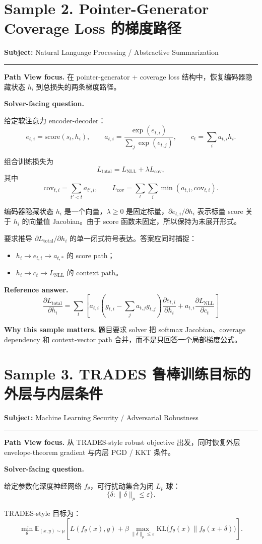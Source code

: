 \documentclass[11pt]{ctexart}
\newcommand{\sampletitle}[2]{
  \section*{\textcolor{agenblue}{#1}}
  \textbf{Subject:} #2
  \vspace{0.25em}
  \hrule
  \vspace{0.6em}
}
\newcommand{\focus}[1]{\textbf{Path View focus.} #1}
\newcommand{\why}[1]{\textbf{Why this sample matters.} #1}
\begin{document}
\sampletitle{Sample 2. Pointer-Generator Coverage Loss 的梯度路径}{Natural Language Processing / Abstractive Summarization}

\focus{在 pointer-generator + coverage loss 结构中，恢复编码器隐藏状态 $h_i$ 到总损失的两条梯度路径。}

\textbf{Solver-facing question.}

给定软注意力 encoder-decoder：
\[
e_{t,i}=\mathrm{score}(s_t,h_i),\qquad
a_{t,i}=\frac{\exp(e_{t,i})}{\sum_j\exp(e_{t,j})},\qquad
c_t=\sum_i a_{t,i}h_i.
\]

组合训练损失为
\[
L_{\mathrm{total}}=L_{\mathrm{NLL}}+\lambda L_{\mathrm{cov}},
\]
其中
\[
\mathrm{cov}_{t,i}=\sum_{t'<t}a_{t',i},\qquad
L_{\mathrm{cov}}=\sum_t\sum_i\min(a_{t,i},\mathrm{cov}_{t,i}).
\]

编码器隐藏状态 $h_i$ 是一个向量，$\lambda\geq0$ 是固定标量，$\partial e_{t,i}/\partial h_i$ 表示标量 score 关于 $h_i$ 的向量值 Jacobian。由于 score 函数未固定，所以保持为未展开形式。

要求推导 $\partial L_{\mathrm{total}}/\partial h_i$ 的单一闭式符号表达。答案应同时捕捉：
\begin{itemize}
  \item $h_i\rightarrow e_{t,i}\rightarrow a_{t,*}$ 的 score path；
  \item $h_i\rightarrow c_t\rightarrow L_{\mathrm{NLL}}$ 的 context path。
\end{itemize}

\textbf{Reference answer.}
\[
\boxed{
\frac{\partial L_{\text{total}}}{\partial h_i}
=
\sum_t
\left[
a_{t,i}\left(g_{t,i}-\sum_j a_{t,j}g_{t,j}\right)
\frac{\partial e_{t,i}}{\partial h_i}
+
a_{t,i}\frac{\partial L_{\text{NLL}}}{\partial c_t}
\right]
}
\]

\why{题目要求 solver 把 softmax Jacobian、coverage dependency 和 context-vector path 合并，而不是只回答一个局部梯度公式。}

\sampletitle{Sample 3. TRADES 鲁棒训练目标的外层与内层条件}{Machine Learning Security / Adversarial Robustness}

\focus{从 TRADES-style robust objective 出发，同时恢复外层 envelope-theorem gradient 与内层 PGD / KKT 条件。}

\textbf{Solver-facing question.}

给定参数化深度神经网络 $f_\theta$，可行扰动集合为闭 $L_p$ 球：
\[
\{\delta:\|\delta\|_p\leq\varepsilon\}.
\]

TRADES-style 目标为：
\[
\min_{\theta}
\mathbb{E}_{(x,y)\sim\mu}
\left[
L(f_\theta(x),y)
+
\beta\max_{\|\delta\|_p\leq\varepsilon}
\mathrm{KL}\bigl(f_\theta(x)\|f_\theta(x+\delta)\bigr)
\right].
\]
\end{document}
